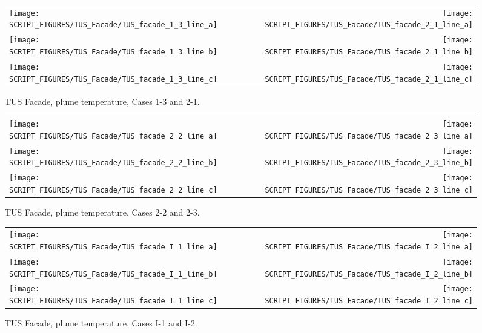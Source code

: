 \begin{figure}[p]
\begin{tabular*}{\textwidth}{l@{\extracolsep{\fill}}r}
\texttt{[image: SCRIPT\_FIGURES/TUS\_Facade/TUS\_facade\_1\_3\_line\_a]} &
\texttt{[image: SCRIPT\_FIGURES/TUS\_Facade/TUS\_facade\_2\_1\_line\_a]} \\
\texttt{[image: SCRIPT\_FIGURES/TUS\_Facade/TUS\_facade\_1\_3\_line\_b]} &
\texttt{[image: SCRIPT\_FIGURES/TUS\_Facade/TUS\_facade\_2\_1\_line\_b]} \\
\texttt{[image: SCRIPT\_FIGURES/TUS\_Facade/TUS\_facade\_1\_3\_line\_c]} &
\texttt{[image: SCRIPT\_FIGURES/TUS\_Facade/TUS\_facade\_2\_1\_line\_c]}
\end{tabular*}
\caption[TUS Facade, plume temperature, Cases 1-3 and 2-1]{TUS Facade, plume temperature, Cases 1-3 and 2-1.}
\label{TUS Facade_Plume_Temp_2}
\end{figure}

\begin{figure}[p]
\begin{tabular*}{\textwidth}{l@{\extracolsep{\fill}}r}
\texttt{[image: SCRIPT\_FIGURES/TUS\_Facade/TUS\_facade\_2\_2\_line\_a]} &
\texttt{[image: SCRIPT\_FIGURES/TUS\_Facade/TUS\_facade\_2\_3\_line\_a]} \\
\texttt{[image: SCRIPT\_FIGURES/TUS\_Facade/TUS\_facade\_2\_2\_line\_b]} &
\texttt{[image: SCRIPT\_FIGURES/TUS\_Facade/TUS\_facade\_2\_3\_line\_b]} \\
\texttt{[image: SCRIPT\_FIGURES/TUS\_Facade/TUS\_facade\_2\_2\_line\_c]} &
\texttt{[image: SCRIPT\_FIGURES/TUS\_Facade/TUS\_facade\_2\_3\_line\_c]}
\end{tabular*}
\caption[TUS Facade, plume temperature, Cases 2-2 and 2-3]{TUS Facade, plume temperature, Cases 2-2 and 2-3.}
\label{TUS Facade_Plume_Temp_3}
\end{figure}

\begin{figure}[p]
\begin{tabular*}{\textwidth}{l@{\extracolsep{\fill}}r}
\texttt{[image: SCRIPT\_FIGURES/TUS\_Facade/TUS\_facade\_I\_1\_line\_a]} &
\texttt{[image: SCRIPT\_FIGURES/TUS\_Facade/TUS\_facade\_I\_2\_line\_a]} \\
\texttt{[image: SCRIPT\_FIGURES/TUS\_Facade/TUS\_facade\_I\_1\_line\_b]} &
\texttt{[image: SCRIPT\_FIGURES/TUS\_Facade/TUS\_facade\_I\_2\_line\_b]} \\
\texttt{[image: SCRIPT\_FIGURES/TUS\_Facade/TUS\_facade\_I\_1\_line\_c]} &
\texttt{[image: SCRIPT\_FIGURES/TUS\_Facade/TUS\_facade\_I\_2\_line\_c]}
\end{tabular*}
\caption[TUS Facade, plume temperature, Cases I-1 and I-2]{TUS Facade, plume temperature, Cases I-1 and I-2.}
\label{TUS Facade_Plume_Temp_4}
\end{figure}




